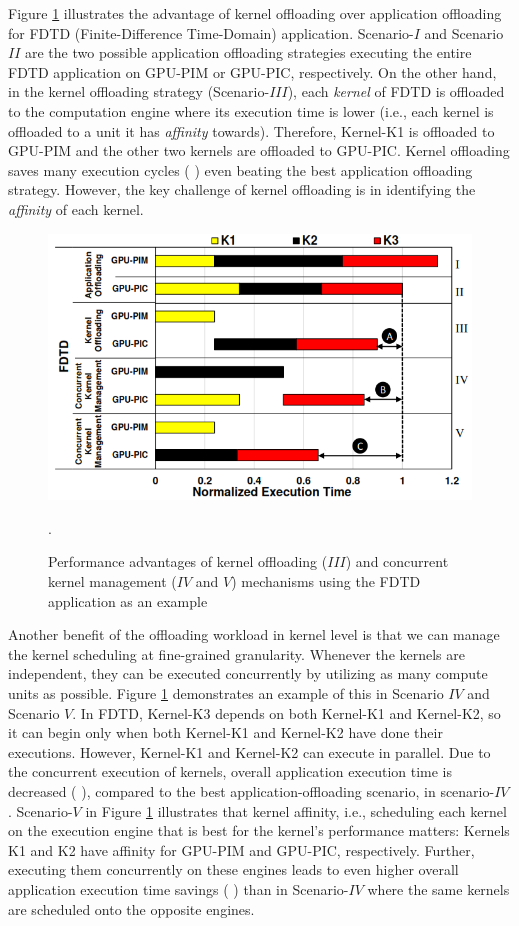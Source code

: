 \documentclass[letterpaper, 11pt, conference, margin=1in]{ieeeconf}   %
\newlength\CLength
\def\Circled#1{\sbox\CBox{#1}%
  \ifdim\wd\CBox>\ht\CBox \CLength=\wd\CBox\else\CLength=\ht\CBox\fi
    \makebox[1.2\CLength]{\makebox(0,1.2\CLength){\put(0,0){\circle{1.2\CLength}}}%
    \makebox(0,1.2\CLength){\put(-.5\wd\CBox,0){#1}}}}
\begin{document}
Figure \ref{fig:gpu-offload} illustrates the advantage of kernel offloading over application offloading for FDTD (Finite-Difference Time-Domain) application. Scenario-$I$ and Scenario $II$ are the two possible application offloading strategies executing the entire FDTD application on GPU-PIM or GPU-PIC, respectively. On the other hand, in the kernel offloading strategy (Scenario-$III$), each \textit{kernel} of FDTD is offloaded to the computation engine where its execution time is lower (i.e., each kernel is offloaded to a unit it has \textit{affinity} towards). Therefore, Kernel-K1 is offloaded to GPU-PIM and the other two kernels are offloaded to GPU-PIC. Kernel offloading saves many execution cycles (\Circled{A}) even beating the best application offloading strategy. However, the key challenge of kernel offloading is in identifying the \textit{affinity} of each kernel.
\begin{figure}[ht]
  \centering
  \includegraphics[scale=0.4]{figures/gpu_offload.png}
  \caption{Performance advantages of kernel offloading ($III$) and concurrent kernel management ($IV$ and $V$) mechanisms using the FDTD application as an example}.
  \label{fig:gpu-offload}
\end{figure}
Another benefit of the offloading workload in kernel level is that we can manage the kernel scheduling at fine-grained granularity. Whenever the kernels are independent, they can be executed concurrently by utilizing as many compute units as possible. Figure \ref{fig:gpu-offload} demonstrates an example of this in Scenario $IV$ and Scenario $V$. In FDTD, Kernel-K3 depends on both Kernel-K1 and Kernel-K2, so it can begin only when both Kernel-K1 and Kernel-K2 have done their executions. However, Kernel-K1 and Kernel-K2 can execute in parallel. Due to the concurrent execution of kernels, overall application execution time is decreased (\Circled{B}), compared to the best application-offloading scenario, in scenario-$IV$. Scenario-$V$ in Figure \ref{fig:gpu-offload} illustrates that kernel affinity, i.e., scheduling each kernel on the execution engine that is best for the kernel's performance matters: Kernels K1 and K2 have affinity for GPU-PIM and GPU-PIC, respectively. Further, executing them concurrently on these engines leads to even higher overall application execution time savings (\Circled{C}) than in Scenario-$IV$ where the same kernels are scheduled onto the opposite engines.
\end{document}
